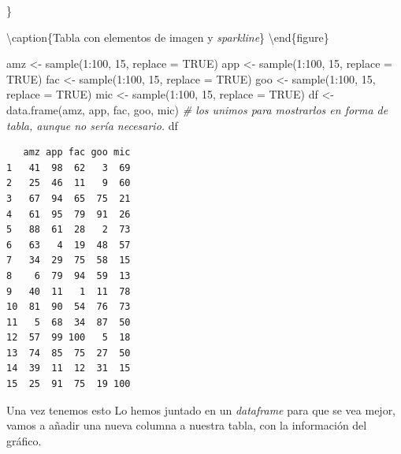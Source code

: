 \documentclass[
]{book}
\newenvironment{Shaded}{\begin{snugshade}}{\end{snugshade}}
\newcommand{\AttributeTok}[1]{\textcolor[rgb]{0.77,0.63,0.00}{#1}}
\newcommand{\CommentTok}[1]{\textcolor[rgb]{0.56,0.35,0.01}{\textit{#1}}}
\newcommand{\ConstantTok}[1]{\textcolor[rgb]{0.00,0.00,0.00}{#1}}
\newcommand{\DecValTok}[1]{\textcolor[rgb]{0.00,0.00,0.81}{#1}}
\newcommand{\FunctionTok}[1]{\textcolor[rgb]{0.00,0.00,0.00}{#1}}
\newcommand{\NormalTok}[1]{#1}
\newcommand{\OtherTok}[1]{\textcolor[rgb]{0.56,0.35,0.01}{#1}}
\newcommand{\SpecialCharTok}[1]{\textcolor[rgb]{0.00,0.00,0.00}{#1}}
\begin{document}
\}

\textbackslash caption\{Tabla con elementos de imagen y \emph{sparkline}\}\label{fig:unnamed-chunk-94}
\textbackslash end\{figure\}

\begin{Shaded}
\begin{Highlighting}[]
\NormalTok{amz }\OtherTok{\textless{}{-}} \FunctionTok{sample}\NormalTok{(}\DecValTok{1}\SpecialCharTok{:}\DecValTok{100}\NormalTok{, }\DecValTok{15}\NormalTok{, }\AttributeTok{replace =} \ConstantTok{TRUE}\NormalTok{)}
\NormalTok{app }\OtherTok{\textless{}{-}} \FunctionTok{sample}\NormalTok{(}\DecValTok{1}\SpecialCharTok{:}\DecValTok{100}\NormalTok{, }\DecValTok{15}\NormalTok{, }\AttributeTok{replace =} \ConstantTok{TRUE}\NormalTok{)}
\NormalTok{fac }\OtherTok{\textless{}{-}} \FunctionTok{sample}\NormalTok{(}\DecValTok{1}\SpecialCharTok{:}\DecValTok{100}\NormalTok{, }\DecValTok{15}\NormalTok{, }\AttributeTok{replace =} \ConstantTok{TRUE}\NormalTok{)}
\NormalTok{goo }\OtherTok{\textless{}{-}} \FunctionTok{sample}\NormalTok{(}\DecValTok{1}\SpecialCharTok{:}\DecValTok{100}\NormalTok{, }\DecValTok{15}\NormalTok{, }\AttributeTok{replace =} \ConstantTok{TRUE}\NormalTok{)}
\NormalTok{mic }\OtherTok{\textless{}{-}} \FunctionTok{sample}\NormalTok{(}\DecValTok{1}\SpecialCharTok{:}\DecValTok{100}\NormalTok{, }\DecValTok{15}\NormalTok{, }\AttributeTok{replace =} \ConstantTok{TRUE}\NormalTok{)}
\NormalTok{df }\OtherTok{\textless{}{-}} \FunctionTok{data.frame}\NormalTok{(amz, app, fac, goo, mic)  }\CommentTok{\# los unimos para mostrarlos en forma de tabla, aunque no sería necesario.}
\NormalTok{df}
\end{Highlighting}
\end{Shaded}

\begin{verbatim}
   amz app fac goo mic
1   41  98  62   3  69
2   25  46  11   9  60
3   67  94  65  75  21
4   61  95  79  91  26
5   88  61  28   2  73
6   63   4  19  48  57
7   34  29  75  58  15
8    6  79  94  59  13
9   40  11   1  11  78
10  81  90  54  76  73
11   5  68  34  87  50
12  57  99 100   5  18
13  74  85  75  27  50
14  39  11  12  31  15
15  25  91  75  19 100
\end{verbatim}

Una vez tenemos esto Lo hemos juntado en un \emph{dataframe} para que se vea mejor, vamos a añadir una nueva columna a nuestra tabla, con la información del gráfico.

\begin{Shaded}
\end{Shaded}
\end{document}

